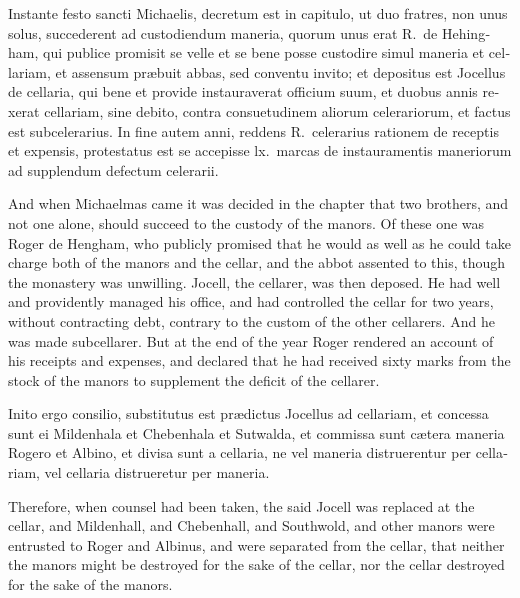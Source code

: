 \documentclass{book}
\begin{document}
\begin{paracol}{2}
\switchcolumn*

\begin{otherlanguage}{latin}
Instante festo sancti Michaelis, decretum est in capitulo, ut duo fratres, non unus solus, succederent ad custodiendum maneria, quorum unus erat R.\ de Hehingham, qui publice promisit se velle et se bene posse custodire simul maneria et cellariam, et assensum pr\ae{}buit abbas, sed conventu invito; et depositus est Jocellus de cellaria, qui bene et provide instauraverat officium suum, et duobus annis rexerat cellariam, sine debito, contra consuetudinem aliorum celerariorum, et factus est subcelerarius. In fine autem anni, reddens R.\ celerarius rationem de receptis et expensis, protestatus est se accepisse lx.\ marcas de instauramentis maneriorum ad supplendum defectum celerarii.
\end{otherlanguage}

\switchcolumn

And when Michaelmas came it was decided in the chapter that two brothers, and not one alone, should succeed to the custody of the manors. Of these one was Roger de Hengham, who publicly promised that he would as well as he could take charge both of the manors and the cellar, and the abbot assented to this, though the monastery was unwilling. Jocell, the cellarer, was then deposed. He had well and providently managed his office, and had controlled the cellar for two years, without contracting debt, contrary to the custom of the other cellarers. And he was made subcellarer. But at the end of the year Roger rendered an account of his receipts and expenses, and declared that he had received sixty marks from the stock of the manors to supplement the deficit of the cellarer.

\switchcolumn*

\begin{otherlanguage}{latin}
Inito ergo consilio, substitutus est pr\ae{}dictus Jocellus ad cellariam, et concessa sunt ei Mildenhala et Chebenhala et Sutwalda, et commissa sunt c\ae{}tera maneria Rogero et Albino, et divisa sunt a cellaria, ne vel maneria distruerentur per cellariam, vel cellaria distrueretur per maneria.
\end{otherlanguage}

\switchcolumn

Therefore, when counsel had been taken, the said Jocell was replaced at the cellar, and Mildenhall, and Chebenhall, and Southwold, and other manors were entrusted to Roger and Albinus, and were separated from the cellar, that neither the manors might be destroyed for the sake of the cellar, nor the cellar destroyed for the sake of the manors.


\end{paracol}
\end{document}
